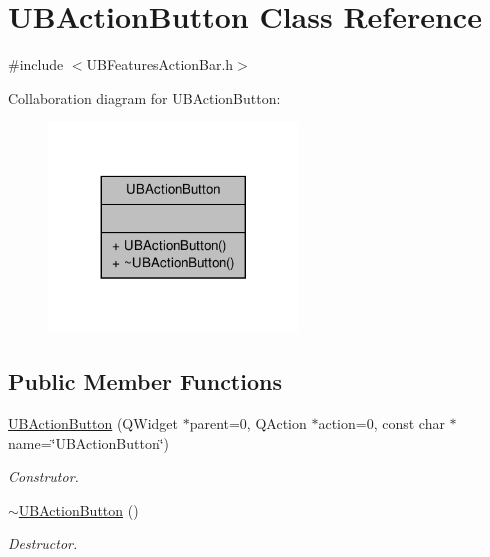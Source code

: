 \hypertarget{class_u_b_action_button}{\section{U\-B\-Action\-Button Class Reference}
\label{d8/d50/class_u_b_action_button}
}


{\ttfamily \#include $<$U\-B\-Features\-Action\-Bar.\-h$>$}



Collaboration diagram for U\-B\-Action\-Button\-:
\nopagebreak
\begin{figure}[H]
\begin{center}
\leavevmode
\includegraphics[width=188pt]{d1/d4c/class_u_b_action_button__coll__graph}
\end{center}
\end{figure}
\subsection*{Public Member Functions}
\begin{DoxyCompactItemize}
\item 
\hyperlink{class_u_b_action_button_a13549fc3172f673944652ad4c8ae227b}{U\-B\-Action\-Button} (Q\-Widget $\ast$parent=0, Q\-Action $\ast$action=0, const char $\ast$name=\char`\"{}U\-B\-Action\-Button\char`\"{})
\begin{DoxyCompactList}\small\item\em Construtor. \end{DoxyCompactList}\item 
\hyperlink{class_u_b_action_button_aff3cc21c273ffd15b6d9725489b00a8c}{$\sim$\-U\-B\-Action\-Button} ()
\begin{DoxyCompactList}\small\item\em Destructor. \end{DoxyCompactList}\end{DoxyCompactItemize}


